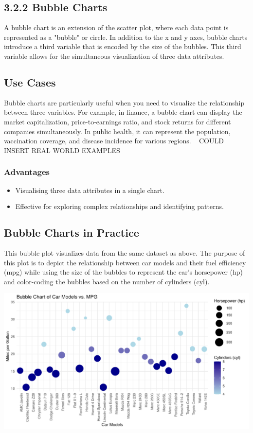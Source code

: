 \documentclass{article}\usepackage[]{graphicx}\usepackage[]{xcolor}
\makeatletter
\def\maxwidth{ %
  \ifdim\Gin@nat@width>\linewidth
    \linewidth
  \else
    \Gin@nat@width
  \fi
}
\newenvironment{knitrout}{}{} %
\makeatother
\begin{document}
\subsection{3.2.2 Bubble Charts}
A bubble chart is an extension of the scatter plot, where each data point is represented as a "bubble" or circle. In addition to the x and y axes, bubble charts introduce a third variable that is encoded by the size of the bubbles. This third variable allows for the simultaneous visualization of three data attributes.

\subsection{Use Cases}
Bubble charts are particularly useful when you need to visualize the relationship between three variables. For example, in finance, a bubble chart can display the market capitalization, price-to-earnings ratio, and stock returns for different companies simultaneously. In public health, it can represent the population, vaccination coverage, and disease incidence for various regions. ~ COULD INSERT REAL WORLD EXAMPLES ~

\subsubsection{Advantages}
\begin{itemize}
    \item Visualising three data attributes in a single chart.
    \item Effective for exploring complex relationships and identifying patterns. 
\end{itemize}

\subsection{Bubble Charts in Practice}
 This bubble plot visualizes data from the same dataset as above. The purpose of this plot is to depict the relationship between car models and their fuel efficiency (mpg) while using the size of the bubbles to represent the car's horsepower (hp) and color-coding the bubbles based on the number of cylinders (cyl).

\begin{knitrout}
\color{fgcolor}
\includegraphics[width=\maxwidth]{figure/buble-plot-chunk-1} 
\end{knitrout}
\end{document}
